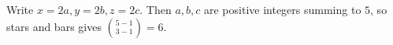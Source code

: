 Write $x=2a,y=2b,z=2c$. Then $a,b,c$ are positive integers summing to $5$, so stars and bars gives $\binom{5-1}{3-1}=\boxed6$.
